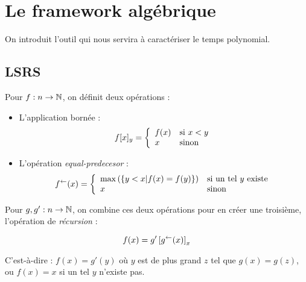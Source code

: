 	
	
	
	\section{Le framework algébrique} %
		\label{sec:framework_algebrique}
	
	On introduit l'outil qui nous servira à caractériser le temps polynomial.
	
		\subsection{LSRS} %
			\label{subsec:LSRS}
		
		
		
			\begin{definition}
				\label{def:app_bornee_eq_pred}
				Pour $f : n \to \mathbb{N}$, on définit deux opérations :
				
				\begin{itemize}
					\item 	L'application bornée :
					\[
						f[x]_y = \left\lbrace \begin{array}{ll} 
										f(x) & \text{si $x<y$} \\
										x 	& \text{sinon}
									 \end{array} \right.
					\]
					
					\item 	L'opération \emph{equal-predecesor} :
					\[
						f^{\leftarrow}(x) = \left\lbrace \begin{array}{ll} 
													\max\left(\left\lbrace y < x | f(x) = f(y)\right\rbrace\right) & \text{si un tel $y$ existe} \\
													x	& \text{sinon}
												 \end{array} \right.
					\]
				\end{itemize}
				
				Pour $g, g' : n \to \mathbb{N}$, on combine ces deux opérations pour en créer une troisième, l'opération de \emph{récursion} :
				
				\[
					f(x) = g'\left[ g^{\leftarrow}(x) \right]_{x}
				\]
				
				C'est-à-dire : $f(x) = g'(y)$ où $y$ est de plus grand $z$ tel que $g(x) = g(z)$, ou $f(x) = x$ si un tel $y$ n'existe pas.
			\end{definition}
			
